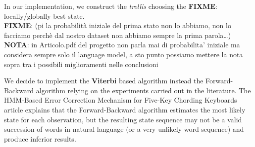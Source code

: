 In our implementation, we construct the \textit{trellis} choosing the \textbf{FIXME}: {locally/globally} best state. 
\\
\textbf{FIXME}: (pi la probabilità iniziale del prima stato non lo abbiamo, non lo facciamo perchè dal nostro 
dataset non 
abbiamo sempre la prima parola…)
\textbf{NOTA}: in Articolo.pdf del progetto non parla mai di probabilita' iniziale ma considera sempre solo il 
language model, a sto punto possiamo mettere la nota sopra tra i possibili miglioramenti nelle conclusioni

We decide to implement the \textbf{Viterbi} based algorithm instead the Forward-Backward algorithm relying on 
the 
experiments carried out in the literature.
The HMM-Based Error Correction Mechanism for Five-Key Chording Keyboards article \cite{tarniceriu2015hmm} 
explains 
that the Forward-Backward algorithm estimates the most likely state for each observation, but the resulting state 
sequence may not be a valid succession of words in natural language (or a very unlikely word sequence) and 
produce 
inferior results.


